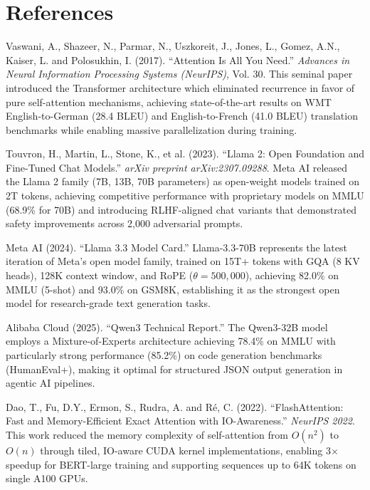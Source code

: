 \chapter*{References}

\begin{enumerate}[label={[\arabic*]}, leftmargin=2cm]

\item Vaswani, A., Shazeer, N., Parmar, N., Uszkoreit, J., Jones, L., Gomez, A.N., Kaiser, L. and Polosukhin, I. (2017). ``Attention Is All You Need.'' \textit{Advances in Neural Information Processing Systems (NeurIPS)}, Vol. 30. This seminal paper introduced the Transformer architecture which eliminated recurrence in favor of pure self-attention mechanisms, achieving state-of-the-art results on WMT English-to-German (28.4 BLEU) and English-to-French (41.0 BLEU) translation benchmarks while enabling massive parallelization during training.

\item Touvron, H., Martin, L., Stone, K., et al. (2023). ``Llama 2: Open Foundation and Fine-Tuned Chat Models.'' \textit{arXiv preprint arXiv:2307.09288}. Meta AI released the Llama 2 family (7B, 13B, 70B parameters) as open-weight models trained on 2T tokens, achieving competitive performance with proprietary models on MMLU (68.9\% for 70B) and introducing RLHF-aligned chat variants that demonstrated safety improvements across 2,000 adversarial prompts.

\item Meta AI (2024). ``Llama 3.3 Model Card.'' Llama-3.3-70B represents the latest iteration of Meta's open model family, trained on 15T+ tokens with GQA (8 KV heads), 128K context window, and RoPE ($\theta = 500{,}000$), achieving 82.0\% on MMLU (5-shot) and 93.0\% on GSM8K, establishing it as the strongest open model for research-grade text generation tasks.

\item Alibaba Cloud (2025). ``Qwen3 Technical Report.'' The Qwen3-32B model employs a Mixture-of-Experts architecture achieving 78.4\% on MMLU with particularly strong performance (85.2\%) on code generation benchmarks (HumanEval+), making it optimal for structured JSON output generation in agentic AI pipelines.

\item Dao, T., Fu, D.Y., Ermon, S., Rudra, A. and R\'{e}, C. (2022). ``FlashAttention: Fast and Memory-Efficient Exact Attention with IO-Awareness.'' \textit{NeurIPS 2022}. This work reduced the memory complexity of self-attention from $O(n^2)$ to $O(n)$ through tiled, IO-aware CUDA kernel implementations, enabling 3$\times$ speedup for BERT-large training and supporting sequences up to 64K tokens on single A100 GPUs.


\end{enumerate}
